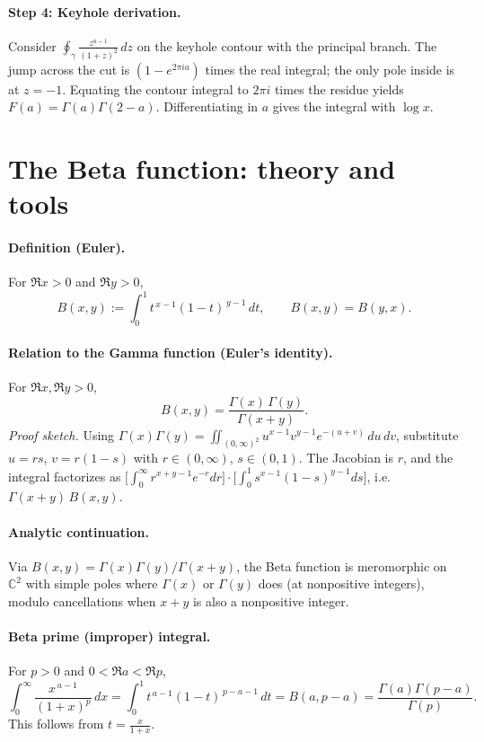 \documentclass[12pt,a4paper]{article}
\newcommand{\C}{\mathbb{C}}
\begin{document}
\paragraph{Step 4: Keyhole derivation.}
Consider \(\displaystyle \oint_\gamma \frac{z^{a-1}}{(1+z)^2}\,dz\) on the keyhole contour with the principal branch.
The jump across the cut is \((1-e^{2\pi i a})\) times the real integral; the only pole inside is at \(z=-1\).
Equating the contour integral to \(2\pi i\) times the residue yields \(F(a)=\Gamma(a)\Gamma(2-a)\).
Differentiating in \(a\) gives the integral with \(\log x\).


\section*{The Beta function: theory and tools}

\paragraph{Definition (Euler).}
For $\Re x>0$ and $\Re y>0$,
\[
B(x,y):=\int_{0}^{1} t^{\,x-1}(1-t)^{\,y-1}\,dt,
\qquad B(x,y)=B(y,x).
\]

\paragraph{Relation to the Gamma function (Euler’s identity).}
For $\Re x,\Re y>0$,
\[
B(x,y)=\frac{\Gamma(x)\,\Gamma(y)}{\Gamma(x+y)}.
\]
\emph{Proof sketch.} Using
$\Gamma(x)\Gamma(y)=\iint_{(0,\infty)^2} u^{x-1}v^{y-1}e^{-(u+v)}\,du\,dv$,
substitute $u=rs$, $v=r(1-s)$ with $r\in(0,\infty)$, $s\in(0,1)$.
The Jacobian is $r$, and the integral factorizes as
$\bigl[\int_{0}^{\infty} r^{x+y-1}e^{-r}dr\bigr]\cdot\bigl[\int_{0}^{1} s^{x-1}(1-s)^{y-1}ds\bigr]$,
i.e.\ $\Gamma(x+y)\,B(x,y)$.

\paragraph{Analytic continuation.}
Via $B(x,y)=\Gamma(x)\Gamma(y)/\Gamma(x+y)$, the Beta function is meromorphic on $\C^2$
with simple poles where $\Gamma(x)$ or $\Gamma(y)$ does (at nonpositive integers), modulo cancellations when $x+y$ is also a nonpositive integer.

\paragraph{Beta prime (improper) integral.}
For $p>0$ and $0<\Re a<\Re p$,
\[
\int_{0}^{\infty}\frac{x^{\,a-1}}{(1+x)^{p}}\,dx
=\int_{0}^{1} t^{\,a-1}(1-t)^{\,p-a-1}\,dt
=B(a,p-a)=\frac{\Gamma(a)\Gamma(p-a)}{\Gamma(p)}.
\]
This follows from $t=\frac{x}{1+x}$.
\end{document}
